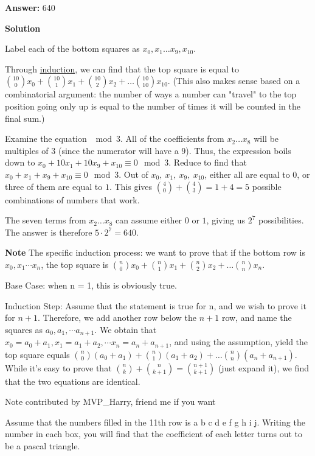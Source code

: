 \begin{enumerate}
 \textbf{Answer: }640



\textbf{Solution}

Label each of the bottom squares as $x_0, x_1 \ldots x_9, x_{10}$. 

 Through \href{https://artofproblemsolving.com/wiki/index.php?title=Induction}{induction}, we can find that the top square is equal to ${10\choose0}x_0 + {10\choose1}x_1 + {10\choose2}x_2 + \ldots {10\choose10}x_{10}$. (This also makes sense based on a combinatorial argument: the number of ways a number can "travel" to the top position going only up is equal to the number of times it will be counted in the final sum.)

 Examine the equation $\mod 3$. All of the coefficients from $x_2 \ldots x_8$ will be multiples of $3$ (since the numerator will have a $9$). Thus, the expression boils down to $x_0 + 10x_1 + 10x_9 + x_{10} \equiv 0 \mod 3$. Reduce to find that $x_0 + x_1 + x_9 + x_{10} \equiv 0 \mod 3$. Out of $x_0,\ x_1,\ x_9,\ x_{10}$, either all are equal to $0$, or three of them are equal to $1$. This gives ${4\choose0} + {4\choose3} = 1 + 4 = 5$ possible combinations of numbers that work. 

 The seven terms from $x_2 \ldots x_8$ can assume either $0$ or $1$, giving us $2^7$ possibilities. The answer is therefore $5 \cdot 2^7 = \boxed{640}$.

 \textbf{Note} The specific induction process: we want to prove that if the bottom row is $x_0, x_1 \cdots x_{n}$, the top square is ${n\choose0}x_0 + {n\choose1}x_1 + {n\choose2}x_2 + \ldots {n\choose{n}}x_{n}$.

 Base Case: when n = 1, this is obviously true.

 Induction Step: Assume that the statement is true for n, and we wish to prove it for $n + 1$. Therefore, we add another row below the $n + 1$ row, and name the squares as $a_0, a_1, \cdots a_{n+1}$. We obtain that $x_0 = a_0 + a_1, x_1 = a_1 + a_2, \cdots x_{n} = a_{n} + a_{n+1}$, and using the assumption, yield the top square equals ${n\choose0}(a_0 + a_1) + {n\choose1}(a_1 + a_2) + \ldots {n\choose{n}}(a_{n} + a_{n+1})$. While it's easy to prove that ${n\choose{k}} + {n\choose{k+1}} = {n+1\choose{k+1}}$ (just expand it), we find that the two equations are identical. 

 Note contributed by MVP\_Harry, friend me if you want ~

 Assume that the numbers filled in the 11th row is a b c d e f g h i j. Writing the number in each box, you will find that the coefficient of each letter turns out to be a pascal triangle.


\end{enumerate}
